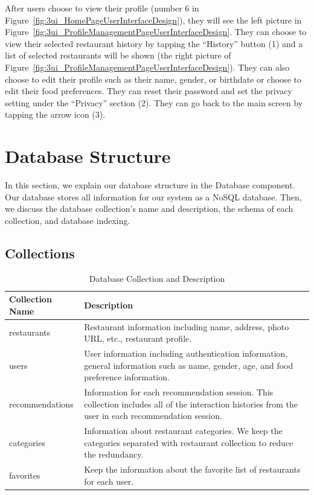 \documentclass[12pt,oneside,openright,a4paper]{cpe-english-project}
\begin{document}
After users choose to view their profile (number 6 in Figure~\ref{fig:3ui_HomePageUserInterfaceDesign}), they will see the left picture in Figure~\ref{fig:3ui_ProfileManagementPageUserInterfaceDesign}. They can choose to view their selected restaurant history by tapping the “History” button (1) and a list of selected restaurants will be shown (the right picture of Figure~\ref{fig:3ui_ProfileManagementPageUserInterfaceDesign}). They can also choose to edit their profile such as their name, gender, or birthdate or choose to edit their food preferences. They can reset their password and set the privacy setting under the “Privacy” section (2). They can go back to the main screen by tapping the arrow icon (3).


\section{Database Structure}
In this section, we explain our database structure in the Database component. Our database stores all information for our system as a NoSQL database. Then, we discuss the database collection’s name and description, the schema of each collection, and database indexing.

\newpage
\subsection{Collections}
\begin{table}[H]
\caption{Database Collection and Description}\label{tbl:3DatabaseCollectionandDescription}
\begin{tabularx}{\textwidth}{l|X} \hline\hline
Collection Name & Description \\ \hline\hline
restaurants & Restaurant information including name, address, photo URL, etc., restaurant profile. \\ \hline
users & User information including authentication information, general information such as name, gender, age, and food preference information. \\ \hline
recommendations & Information for each recommendation session. This collection includes all of the interaction histories from the user in each recommendation session. \\ \hline
categories & Information about restaurant categories. We keep the categories separated with restaurant collection to reduce the redundancy. \\ \hline
favorites & Keep the information about the favorite list of restaurants for each user. \\ \hline\hline
\end{tabularx}
\end{table}
\end{document}
